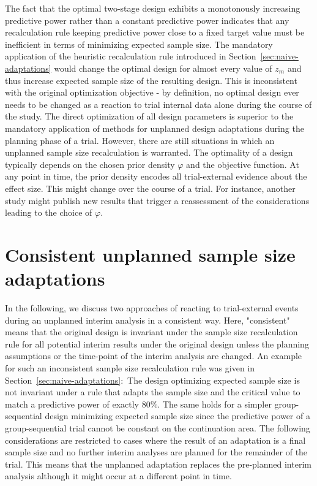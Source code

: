 \documentclass[12pt]{article}
\begin{document}
The fact that the optimal two-stage design exhibits a monotonously increasing
predictive power rather than a constant predictive power
indicates that any recalculation rule keeping predictive power
close to a fixed target value must be inefficient in terms of minimizing expected sample size.
The mandatory application of the heuristic recalculation rule introduced in Section~\ref{sec:naive-adaptations} would change the optimal design for almost every value of $z_m$ and thus increase expected sample size
of the resulting design.
This is inconsistent with the original optimization objective -
by definition,
no optimal design ever needs to be changed as a reaction to trial internal data alone during the course of the study.
The direct optimization of all design parameters is superior to the mandatory application of methods for unplanned design adaptations during the planning phase of a trial.
However, there are still situations in which an unplanned sample size recalculation is warranted.
The optimality of a design typically depends on the chosen prior density $\varphi$ and the objective function.
At any point in time,
the prior density encodes all trial-external evidence
about the effect size.
This might change over the course of a trial.
For instance, another study might publish new results that trigger a reassessment of the considerations leading to the choice of $\varphi$.


\section{Consistent unplanned sample size adaptations}
\label{sec:unplanned-adaptation}

In the following, we discuss two approaches of reacting to
trial-external events during an unplanned interim analysis in a consistent way.
Here, "consistent" means that the original design is invariant under
the sample size recalculation rule for all potential interim
results under the original design unless the planning assumptions or
the time-point of the interim analysis are changed.
An example for such an inconsistent sample size recalculation rule was given in Section~\ref{sec:naive-adaptations}:~The design optimizing expected sample size is not invariant under a rule that adapts the sample size and the critical value to match a predictive power of exactly $80\%$.
The same holds for a simpler group-sequential design minimizing expected sample size
since the predictive power of a group-sequential trial cannot be constant on the continuation area.
The following considerations are restricted to cases where the result of an adaptation is a final sample size and no further interim analyses are planned for the remainder of the trial.
This means that the unplanned adaptation replaces the pre-planned interim analysis although it might occur at a different point in time.
\end{document}
